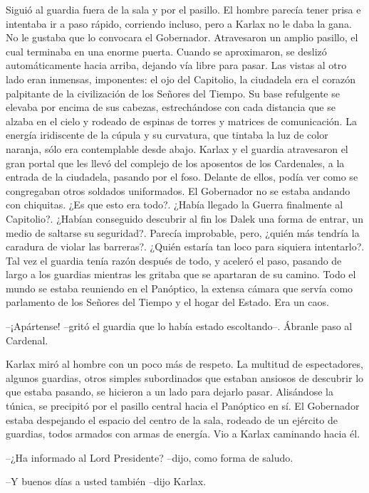 Siguió al guardia fuera de la sala y por el pasillo. El hombre parecía tener prisa e intentaba ir a paso rápido, corriendo incluso, pero a Karlax no le daba la gana. No le gustaba que lo convocara el Gobernador.
Atravesaron un amplio pasillo, el cual terminaba en una enorme puerta. Cuando se aproximaron, se deslizó automáticamente hacia arriba, dejando vía libre para pasar. Las vistas al otro lado eran inmensas, imponentes: el ojo del Capitolio, la ciudadela era el corazón palpitante de la civilización de los Señores del Tiempo. Su base refulgente se elevaba por encima de sus cabezas, estrechándose con cada distancia que se alzaba en el cielo y rodeado de espinas de torres y matrices de comunicación. La energía iridiscente de la cúpula y su curvatura, que tintaba la luz de color naranja, sólo era contemplable desde abajo.  
Karlax y el guardia atravesaron el gran portal que les llevó del complejo de los aposentos de los Cardenales, a la entrada de la ciudadela, pasando por el foso. Delante de ellos, podía ver como se congregaban otros soldados uniformados. El Gobernador no se estaba andando con chiquitas. 
¿Es que esto era todo?. ¿Había llegado la Guerra finalmente al Capitolio?. ¿Habían conseguido descubrir al fin los Dalek una forma de entrar, un medio de saltarse su seguridad?. Parecía improbable, pero, ¿quién más tendría la caradura de violar las barreras?. ¿Quién estaría tan loco para siquiera intentarlo?.
Tal vez el guardia tenía razón después de todo, y aceleró el paso, pasando de largo a los guardias mientras les gritaba que se apartaran de su camino.
Todo el mundo se estaba reuniendo en el Panóptico, la extensa cámara que servía como parlamento de los Señores del Tiempo y el hogar del Estado. Era un caos.

--¡Apártense! --gritó el guardia que lo había estado escoltando--. Ábranle paso al Cardenal.

Karlax miró al hombre con un poco más de respeto. La multitud de espectadores, algunos guardias, otros simples subordinados que estaban ansiosos de descubrir lo que estaba pasando, se hicieron a un lado para dejarlo pasar.
Alisándose la túnica, se precipitó por el pasillo central hacia el Panóptico en sí. El Gobernador estaba despejando el espacio del centro de la sala, rodeado de un ejército de guardias, todos armados con armas de energía. Vio a Karlax caminando hacia él.

--¿Ha informado al Lord Presidente? --dijo, como forma de saludo.

--Y buenos días a usted también --dijo Karlax.

